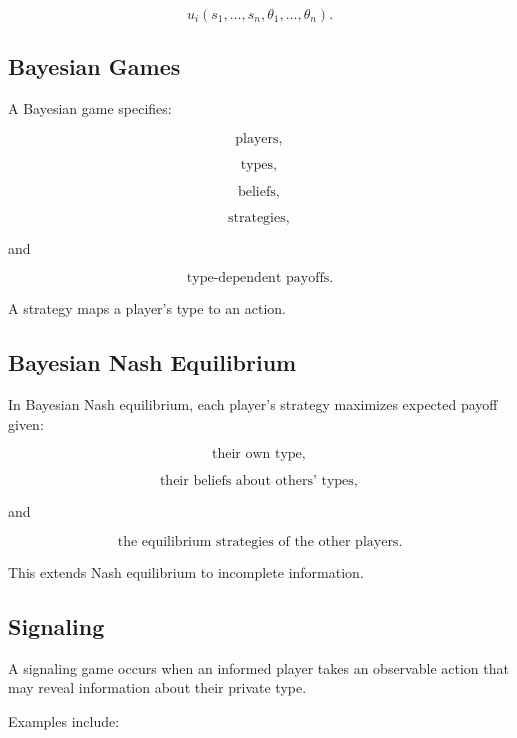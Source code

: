\[
\boxed{
u_i
(
s_1,\ldots,s_n,
\theta_1,\ldots,\theta_n
).
}
\]

\subsection{Bayesian Games}
\label{subsec:bayesian-games}

A Bayesian game specifies:

\[
\boxed{
\text{players},
}
\]

\[
\boxed{
\text{types},
}
\]

\[
\boxed{
\text{beliefs},
}
\]

\[
\boxed{
\text{strategies},
}
\]

and

\[
\boxed{
\text{type-dependent payoffs}.
}
\]

A strategy maps a player's type to an action.

\subsection{Bayesian Nash Equilibrium}
\label{subsec:bayesian-nash-equilibrium}

In Bayesian Nash equilibrium, each player's strategy maximizes expected
payoff given:

\[
\boxed{
\text{their own type},
}
\]

\[
\boxed{
\text{their beliefs about others' types},
}
\]

and

\[
\boxed{
\text{the equilibrium strategies of the other players}.
}
\]

This extends Nash equilibrium to incomplete information.

\subsection{Signaling}
\label{subsec:game-theory-signaling}

A signaling game occurs when an informed player takes an observable action
that may reveal information about their private type.

Examples include:

